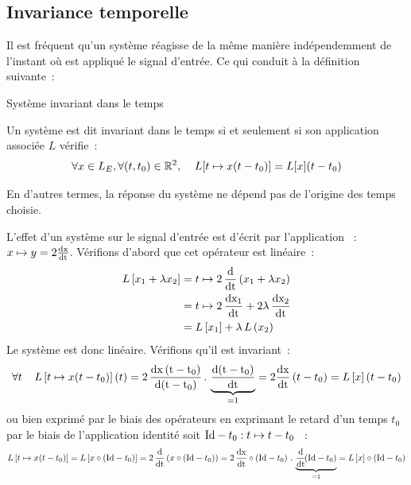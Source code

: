 \begin{remark}{}
	\subsection{Invariance temporelle}
	Il est fréquent qu'un système réagisse de la même manière
        indépendemment de l'instant où est appliqué le signal
        d'entrée. Ce qui conduit à la définition suivante~:
	\begin{definition}{Système invariant dans le temps}
          
          Un système est dit invariant dans le temps si et seulement
          si son application associée $L$ vérifie~:
          \begin{equation}
            \forall x\in L_E, \forall (t,t_0)\in \mathbb{R}^2, \;\;\;\; L[t\mapsto x(t-t_{0})] = L[x](t-t_{0}) 
          \end{equation}
	\end{definition}
	
	En d'autres termes, la réponse du système ne dépend pas de
        l'origine des temps choisie.
        
	\begin{exemple}
          L'effet d'un système sur le signal d'entrée est d'écrit par
          l'application ~: $x \mapsto y=2\frac{\mathrm{d{x}}}{\mathrm{d{t}}}$.  Vérifions
          d'abord que cet opérateur est linéaire~:
          \begin{eqnarray*}
            L\left[x_1+\lambda x_2\right] &= t \mapsto 2\, \frac{\mathrm{d{}}}{\mathrm{d{t}}}\left(x_1+\lambda x_2\right)\\
                                 &= t \mapsto 2\,\frac{\mathrm{d{x_{1}}}}{\mathrm{d{t}}} + 2\lambda\,\frac{\mathrm{d{x_{2}}}}{\mathrm{d{t}}}\\
                                 &= L\left[x_{1}\right]+\lambda\,L\left(x_{2}\right)
          \end{eqnarray*}
          Le système est donc linéaire. Vérifions qu'il est
          invariant~:
          \begin{equation*}
            \forall t \;\;\;\; L\left[t\mapsto x(t-t_{0})\right](t) =2\,\frac{\mathrm{d{x\left(t-t_0\right)}}}{\mathrm{d{\left(t-t_0\right)}}}\,.\,\underbrace{\frac{\mathrm{d{\left(t-t_0\right)}}}{\mathrm{d{t}}}}_{=1}=2\frac{\mathrm{d{x}}}{\mathrm{d{t}}}\left(t-t_0\right)=L\left[x\right]\left(t-t_0\right)
          \end{equation*}
          ou bien exprimé par le biais des opérateurs en exprimant le
          retard d'un temps $t_0$ par le biais de l'application
          identité soit $\mathrm{Id}-t_0 : t \mapsto t - t_0$ ~:
          \begin{equation*}
            L\left[t\mapsto x(t-t_{0})\right] = L\left[x \circ \left(\mathrm{Id}-t_0\right)\right]=2\,\frac{\mathrm{d{}}}{\mathrm{d{t}}}\left(x\circ\left(\mathrm{Id} -t_{0}\right)\right)=2\,\frac{\mathrm{d{x}}}{\mathrm{d{t}}}\circ\left(\mathrm{Id}-t_0\right)\,.\,\underbrace{\frac{\mathrm{d{}}}{\mathrm{d{t}}}\!\!\left(\mathrm{Id}-t_0\right)}_{=1}=L\left[x\right]\circ\left(\mathrm{Id}-t_0\right)
          \end{equation*}
        \end{exemple}
	

\end{remark}
